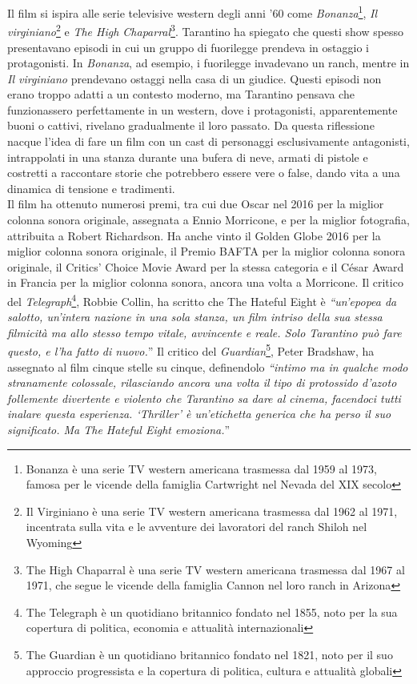 \documentclass[12pt]{article} %
\begin{document}
\begin{flushleft}
    Il film si ispira alle serie televisive western degli anni '60 come \textit{Bonanza}\footnote{Bonanza è una serie TV western americana trasmessa dal 1959 al 1973, famosa per le vicende della famiglia Cartwright nel Nevada del XIX secolo}, \textit{Il virginiano}\footnote{Il Virginiano è una serie TV western americana trasmessa dal 1962 al 1971, incentrata sulla vita e le avventure dei lavoratori del ranch Shiloh nel Wyoming} e \textit{The High Chaparral}\footnote{The High Chaparral è una serie TV western americana trasmessa dal 1967 al 1971, che segue le vicende della famiglia Cannon nel loro ranch in Arizona}. Tarantino ha spiegato che questi show spesso presentavano episodi in cui un gruppo di fuorilegge prendeva in ostaggio i protagonisti. In \textit{Bonanza}, ad esempio, i fuorilegge invadevano un ranch, mentre in \textit{Il virginiano} prendevano ostaggi nella casa di un giudice.
    Questi episodi non erano troppo adatti a un contesto moderno, ma Tarantino pensava che funzionassero perfettamente in un western, dove i protagonisti, apparentemente buoni o cattivi, rivelano gradualmente il loro passato. 
    Da questa riflessione nacque l'idea di fare un film con un cast di personaggi esclusivamente antagonisti, intrappolati in una stanza durante una bufera di neve, armati di pistole e costretti a raccontare storie che potrebbero essere vere o false, dando vita a una dinamica di tensione e tradimenti.
    \\\vspace{1cm}
    Il film ha ottenuto numerosi premi, tra cui due Oscar nel 2016 per la miglior colonna sonora originale, assegnata a Ennio Morricone, e per la miglior fotografia, attribuita a Robert Richardson. Ha anche vinto il Golden Globe 2016 per la miglior colonna sonora originale, il Premio BAFTA per la miglior colonna sonora originale, il Critics' Choice Movie Award per la stessa categoria e il César Award in Francia per la miglior colonna sonora, ancora una volta a Morricone.
    Il critico del \textit{Telegraph}\footnote{The Telegraph è un quotidiano britannico fondato nel 1855, noto per la sua copertura di politica, economia e attualità internazionali}, Robbie Collin, ha scritto che The Hateful Eight è \textit{“un'epopea da salotto, un'intera nazione in una sola stanza, un film intriso della sua stessa filmicità ma allo stesso tempo vitale, avvincente e reale. Solo Tarantino può fare questo, e l'ha fatto di nuovo.}” 
    Il critico del \textit{Guardian}\footnote{The Guardian è un quotidiano britannico fondato nel 1821, noto per il suo approccio progressista e la copertura di politica, cultura e attualità globali}, Peter Bradshaw, ha assegnato al film cinque stelle su cinque, definendolo \textit{“intimo ma in qualche modo stranamente colossale, rilasciando ancora una volta il tipo di protossido d'azoto follemente divertente e violento che Tarantino sa dare al cinema, facendoci tutti inalare questa esperienza. ‘Thriller’ è un’etichetta generica che ha perso il suo significato. Ma The Hateful Eight emoziona.}”
\end{flushleft}
\break
\end{document}
